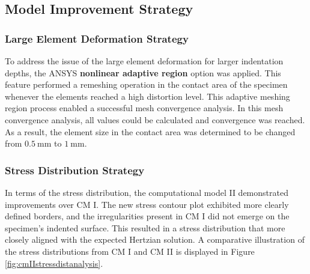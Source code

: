 \subsection{Model Improvement Strategy}
\subsubsection*{Large Element Deformation Strategy}
To address the issue of the large element deformation for larger indentation depths, the ANSYS \textbf{nonlinear adaptive region}
option was applied. This feature performed a remeshing operation in the contact area of the specimen whenever 
the elements reached a high distortion level. This adaptive meshing region process enabled
a successful mesh convergence analysis. In this mesh convergence analysis, all values could be calculated and 
convergence was reached. As a result, the element size in the contact area was determined to be changed from 
$\SI{0.5}{\milli\meter}$ to $\SI{1}{\milli\meter}$. 

\subsubsection*{Stress Distribution Strategy}
In terms of the stress distribution, the computational model II demonstrated improvements over CM I. The new
stress contour plot exhibited more clearly defined borders, and the irregularities present in CM I did not 
emerge on the specimen's indented surface. This resulted in a stress distribution that more closely aligned
with the expected Hertzian solution. A comparative illustration of the stress distributions from CM I and 
CM II is displayed in Figure \ref{fig:cmIIstressdistanalysis}.\\

